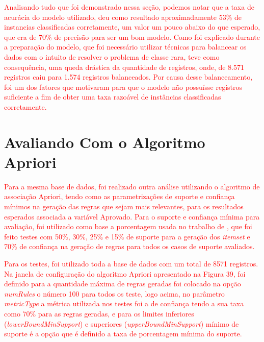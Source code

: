 \par
\textcolor{red}{Analisando tudo que foi demonstrado nessa seção, podemos notar que a taxa de acurácia do modelo utilizado, deu como resultado aproximadamente 53\% de instancias classificadas corretamente, um valor um pouco abaixo do que esperado, que era de 70\% de precisão para ser um bom modelo. Como foi explicado durante a preparação do modelo, que foi necessário utilizar técnicas para balancear os dados com o intuito de resolver o problema de classe rara, teve como consequência, uma queda drástica da quantidade de registros, onde, de 8.571 registros caiu para 1.574 registros balanceados. Por causa desse balanceamento, foi um dos fatores que motivaram para que o modelo não possuísse registros suficiente a fim de obter uma taxa razoável de instâncias classificadas corretamente.}



\section{Avaliando Com o Algoritmo Apriori}


\textcolor{red}{Para a mesma base de dados, foi realizado outra análise utilizando o algoritmo de associação Apriori, tendo como as parametrizações de suporte e confiança mínimos na geração das regras que sejam mais relevantes, para os resultados esperados associada a variável Aprovado. Para o suporte e confiança mínima para avaliação, foi utilizado como base a porcentagem usada no trabalho de , que foi feito testes com 50\%, 30\%, 25\% e 15\% de suporte para a geração dos \textit{itemset} e 70\% de confiança na geração de regras para todos os casos de suporte avaliados.}

\par
\textcolor{red}{Para os testes, foi utilizado toda a base de dados com um total de 8571 registros. Na janela de configuração do algoritmo Apriori apresentado na Figura 39, foi definido para a quantidade máxima de regras geradas foi colocado na opção \textit{numRules} o número 100 para todos os teste, logo acima, no parâmetro \textit{metricType} a métrica utilizada nos testes foi a de confiança tendo a sua taxa como 70\% para as regras geradas, e para os limites inferiores (\textit{lowerBoundMinSupport}) e superiores (\textit{upperBoundMinSupport}) mínimo de suporte é a opção que é definido a taxa de porcentagem mínima do suporte.}


